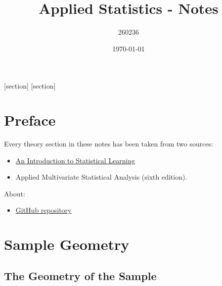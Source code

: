 \documentclass[a4paper]{article}
\begin{document}
    [section]
    [section]
    
    

    \author{260236}
	\title{Applied Statistics - Notes}
	\date{\printdayoff\today}
	\maketitle

	\newpage

    \section*{Preface}

    Every theory section in these notes has been taken from two sources:
    \begin{itemize}
        \item \href{https://www.statlearning.com/}{An Introduction to Statistical Learning}\cite{james2013introduction}
        \item Applied Multivariate Statistical Analysis (sixth edition).\cite{johnson2007applied}
    \end{itemize}
    About:
    \begin{itemize}
        \item[\faIcon{github}] \href{https://github.com/PoliMI-HPC-E-notes-projects-AndreVale69/HPC-E-PoliMI-university-notes}{GitHub repository}
    \end{itemize}
    
    \newpage
	
	\tableofcontents
	
	\newpage

    \section{Sample Geometry}

    \subsection{The Geometry of the Sample}
\end{document}
